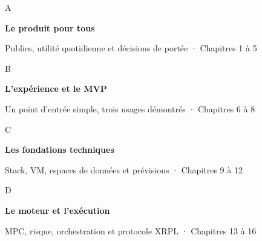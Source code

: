 \documentclass[10pt,a4paper]{article}
\begin{document}
\noindent\begin{minipage}[t]{.08\linewidth}{\displayfont\fontsize{22}{25}\selectfont\color{forest}A}\end{minipage}\begin{minipage}[t]{.79\linewidth}{\bfseries Le produit pour tous}\par{\fontsize{9}{12}\selectfont Publics, utilité quotidienne et décisions de portée · Chapitres 1 à 5}\end{minipage}\begin{minipage}[t]{.10\linewidth}\raggedleft\color{forest}\pageref{ch:1}\end{minipage}\par\vspace{9pt}
\noindent\begin{minipage}[t]{.08\linewidth}{\displayfont\fontsize{22}{25}\selectfont\color{forest}B}\end{minipage}\begin{minipage}[t]{.79\linewidth}{\bfseries L’expérience et le MVP}\par{\fontsize{9}{12}\selectfont Un point d’entrée simple, trois usages démontrés · Chapitres 6 à 8}\end{minipage}\begin{minipage}[t]{.10\linewidth}\raggedleft\color{forest}\pageref{ch:6}\end{minipage}\par\vspace{9pt}
\noindent\begin{minipage}[t]{.08\linewidth}{\displayfont\fontsize{22}{25}\selectfont\color{forest}C}\end{minipage}\begin{minipage}[t]{.79\linewidth}{\bfseries Les fondations techniques}\par{\fontsize{9}{12}\selectfont Stack, VM, espaces de données et prévisions · Chapitres 9 à 12}\end{minipage}\begin{minipage}[t]{.10\linewidth}\raggedleft\color{forest}\pageref{ch:9}\end{minipage}\par\vspace{9pt}
\noindent\begin{minipage}[t]{.08\linewidth}{\displayfont\fontsize{22}{25}\selectfont\color{forest}D}\end{minipage}\begin{minipage}[t]{.79\linewidth}{\bfseries Le moteur et l’exécution}\par{\fontsize{9}{12}\selectfont MPC, risque, orchestration et protocole XRPL · Chapitres 13 à 16}\end{minipage}\begin{minipage}[t]{.10\linewidth}\raggedleft\color{forest}\pageref{ch:13}\end{minipage}\par\vspace{9pt}
\end{document}
